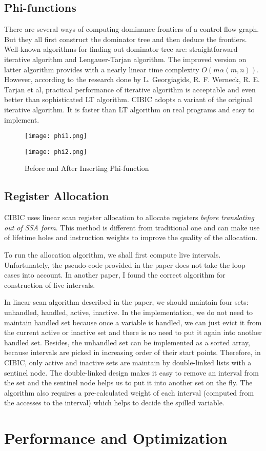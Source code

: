 \documentclass[10pt, a4paper]{article}
\begin{document}
\subsection{Phi-functions}
There are several ways of computing dominance frontiers of a control flow graph.
But they all first construct the dominator tree and then deduce the frontiers.
Well-known algorithms for finding out dominator tree are: straightforward
iterative algorithm and Lengauer-Tarjan algorithm. The improved version on
latter algorithm provides with a nearly linear time complexity $O(m \alpha(m,
n))$. However, according to the research done by L. Georgiagids, R.  F. Werneck,
R. E. Tarjan et al, practical performance of iterative algorithm is acceptable
and even better than sophisticated LT algorithm. CIBIC adopts a variant of the
original iterative algorithm. It is faster than LT algorithm on real programs
and easy to implement.
\begin{figure}
    \centering
    \begin{minipage}{0.4\textwidth}
        \texttt{[image: phi1.png]}
    \end{minipage}
    \begin{minipage}{0.4\textwidth}
        \texttt{[image: phi2.png]}
    \end{minipage}
    \caption{Before and After Inserting Phi-function}
    \label{fig:phi_function}
\end{figure}
\subsection{Register Allocation}
CIBIC uses linear scan register allocation to allocate registers \emph{before
translating out of SSA form}. This method is different from traditional one and
can make use of lifetime holes and instruction weights to improve the quality of
the allocation.

To run the allocation algorithm, we shall first compute live intervals.
Unfortunately, the pseudo-code provided in the paper does not take the loop
cases into account. In another paper, I found the correct algorithm for
construction of live intervals.

In linear scan algorithm described in the paper, we should maintain four sets:
unhandled, handled, active, inactive. In the implementation, we do not need to
maintain handled set because once a variable is handled, we can just evict it
from the current active or inactive set and there is no need to put it again
into another handled set. Besides, the unhandled set can be implemented as a
sorted array, because intervals are picked in increasing order of their start
points. Therefore, in CIBIC, only active and inactive sets are maintain by
double-linked lists with a sentinel node. The double-linked design makes it easy
to remove an interval from the set and the sentinel node helps us to put it into
another set on the fly. The algorithm also requires a pre-calculated weight of
each interval (computed from the accesses to the interval) which helps to decide
the spilled variable.
\section{Performance and Optimization}
\end{document}
